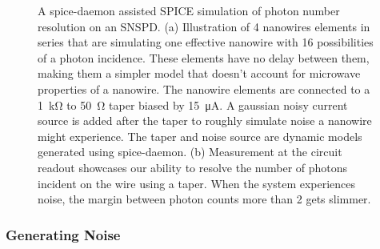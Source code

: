 \begin{figure}
    \centering
    \caption{A spice-daemon assisted SPICE simulation of photon number resolution on an SNSPD.
    (a) Illustration of 4 nanowires elements in series that are simulating one 
    effective nanowire with 16
    possibilities of a photon incidence. These elements have no delay between them, making
    them a simpler model that doesn't account for microwave properties of a nanowire.
    The nanowire elements are connected to a \qty{1}{\kilo\ohm} to \qty{50}{\ohm} taper
    biased by \qty{15}{\micro\ampere}. A gaussian noisy current source is added after the taper to
    roughly simulate noise a nanowire might experience.
    The taper and noise source are dynamic models generated using spice-daemon.
    (b) Measurement at the circuit readout showcases our ability to resolve the number of
    photons incident on the wire using a taper. When the system experiences noise, the
    margin between photon counts more than 2 gets slimmer.}
    \label{fig:taper_pnr}
\end{figure}



\subsubsection{Generating Noise} \label{gen_noise}


